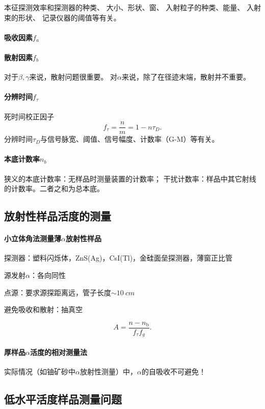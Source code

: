 本征探测效率和探测器的种类、
大小、形状、窗、
入射粒子的种类、能量、
入射束的形状、
记录仪器的阈值等有关。
\paragraph{吸收因素$f_a$}
\paragraph{散射因素$f_b$}
对于$\beta,\gamma$来说，散射问题很重要。
对$\alpha$来说，除了在径迹末端，散射并不重要。
\paragraph{分辨时间$f_\tau$}
死时间校正因子
\[
	f_\tau=\frac nm=1-n\tau_D.
\]
分辨时间$\tau_D$与信号脉宽、阈值、信号幅度、计数率（G-M）等有关。
\paragraph{本底计数率$n_b$}
狭义的本底计数率：无样品时测量装置的计数率；
干扰计数率：样品中其它射线的计数率。二者之和为总本底。

\subsection{\textalpha 放射性样品活度的测量}

\paragraph{小立体角法测量薄$\alpha$放射性样品}
\begin{compactitem}
	\item 探测器：塑料闪烁体，ZnS(Ag)，CsI(Tl)，金硅面垒探测器，薄窗正比管
	\item 源发射$\alpha$：各向同性
	\item 点源：要求源探距离远，管子长度$\sim\SI{10}{cm}$
	\item 避免吸收和散射：抽真空
\end{compactitem}
\[
	A=\frac{n-n_\mathrm b}{f_\tau f_g}.
\]
\paragraph{厚样品$\alpha$活度的相对测量法}
实际情况（如铀矿砂中$\alpha$放射性测量）中，$\alpha$的自吸收不可避免！

\subsection{低水平活度样品测量问题}

